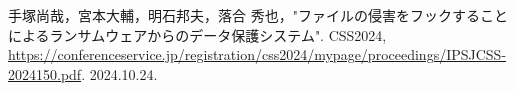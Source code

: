 \item 手塚尚哉，宮本大輔，明石邦夫，落合 秀也，"ファイルの侵害をフックすることによるランサムウェアからのデータ保護システム". CSS2024,
\url{https://conferenceservice.jp/registration/css2024/mypage/proceedings/IPSJCSS-2024150.pdf}. 2024.10.24.
